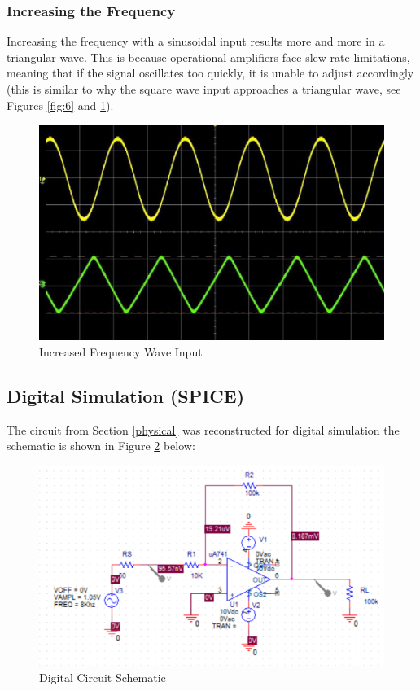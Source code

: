 \documentclass[
	letterpaper, %
	10pt, %
]{CSUniSchoolLabReport}
\begin{document}
\subsubsection{Increasing the Frequency}

Increasing the frequency with a sinusoidal input results more and more in a triangular wave. This is because operational amplifiers face slew rate limitations, meaning that if the signal oscillates too quickly, it is unable to adjust accordingly (this is similar to why the square wave input approaches a triangular wave, see Figures \ref{fig:6} and \ref{fig:7}).

\begin{figure}[H]
  \centering
  \includegraphics[width=.9\textwidth]{Figures/L1R4.png}
  \caption{Increased Frequency Wave Input}
  \label{fig:7}
\end{figure}

\subsection{Digital Simulation (SPICE)}

The circuit from Section \ref{physical} was reconstructed for digital simulation the schematic is shown in Figure \ref{fig:8} below:

\begin{figure}[H]
  \centering
  \includegraphics[width=.9\textwidth]{Figures/L1Schematic.png}
  \caption{Digital Circuit Schematic}
  \label{fig:8}
\end{figure}
\end{document}
